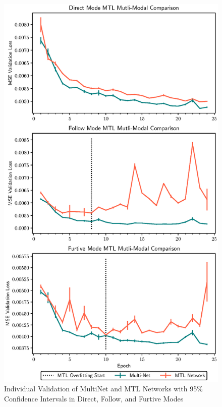 \begin{figure}[t]
\centering
\includegraphics[width=\linewidth]{paper/content/images/individual_new}
\caption{Individual Validation of MultiNet and MTL Networks with 95\% Confidence Intervals in Direct, Follow, and Furtive Modes}

\label{fig:furtivegraph}
\end{figure}


